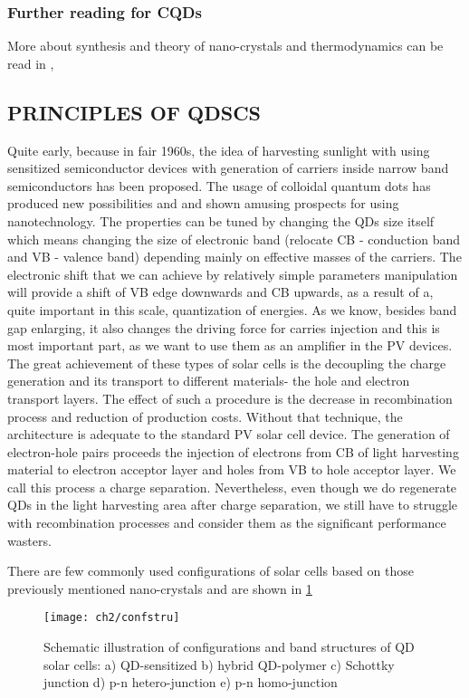 \subsubsection{Further reading for CQDs}
More about synthesis and theory of nano-crystals and thermodynamics can be read in \cite{Klimov}, \cite{crystal}

\subsection{PRINCIPLES OF QDSCS}
Quite early, because in fair 1960s, the idea of harvesting sunlight with using sensitized semiconductor devices with generation of carriers inside narrow band semiconductors has been proposed. The usage of colloidal quantum dots has produced new possibilities and and shown amusing prospects for using nanotechnology. The properties can be tuned by changing the QDs size itself which means changing the size of electronic band (relocate CB - conduction band and VB - valence band) depending mainly on effective masses of the carriers. The electronic shift that we can achieve by relatively simple parameters manipulation will provide a shift of VB edge downwards and CB upwards, as a result of a, quite important in this scale, quantization of energies. As we know, besides band gap enlarging, it also changes the driving force for carries injection and this is most important part, as we want to use them as an amplifier in the PV devices. The great achievement of these types of solar cells is the decoupling the charge generation and its transport to different materials- the hole and electron transport layers. The effect of such a procedure is the decrease in recombination process and reduction of production costs.  Without that technique, the architecture is adequate to the standard PV solar cell device. The generation of electron-hole pairs proceeds the injection of electrons from CB of light harvesting material to electron acceptor layer and holes from VB to hole acceptor layer. We call this process a charge separation. Nevertheless, even though we do regenerate QDs in the light harvesting area after charge separation, we still have to struggle with recombination processes and consider them as the significant performance wasters. \cite{S.Gimenez2009}


There are few commonly used configurations of solar cells based on those previously mentioned nano-crystals and are shown in \ref{fig:confstru}

\begin{figure}[ht]
\centering
\texttt{[image: ch2/confstru]}
\caption{Schematic illustration of configurations and band structures of QD solar cells: a) QD-sensitized b) hybrid QD-polymer c) Schottky junction d) p-n hetero-junction e) p-n homo-junction \cite{HuashangRao2018}}
\label{fig:confstru}
\end{figure}

